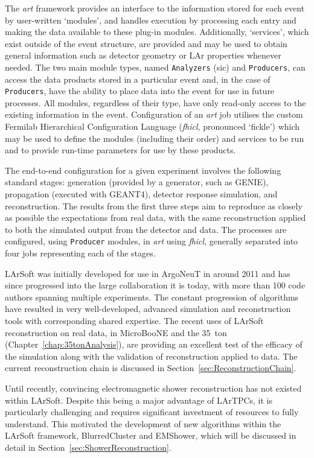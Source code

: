 The \textit{art} framework provides an interface to the information stored for each event by user-written `modules', and handles execution by processing each entry and making the data available to these plug-in modules.  Additionally, `services', which exist outside of the event structure, are provided and may be used to obtain general information such as detector geometry or LAr properties whenever needed.  The two main module types, named \texttt{Analyzers} (sic) and \texttt{Producers}, can access the data products stored in a particular event and, in the case of \texttt{Producers}, have the ability to place data into the event for use in future processes.  All modules, regardless of their type, have only read-only access to the existing information in the event.  Configuration of an \textit{art} job utilises the custom Fermilab Hierarchical Configuration Language (\textit{fhicl}, pronounced `fickle') which may be used to define the modules (including their order) and services to be run and to provide run-time parameters for use by these products.

The end-to-end configuration for a given experiment involves the following standard stages: generation (provided by a generator, such as GENIE), propagation (executed with GEANT4), detector response simulation, and reconstruction.  The results from the first three steps aim to reproduce as closely as possible the expectations from real data, with the same reconstruction applied to both the simulated output from the detector and data.  The processes are configured, using \texttt{Producer} modules, in \textit{art} using \textit{fhicl}, generally separated into four jobs representing each of the stages.

LArSoft was initially developed for use in ArgoNeuT in around 2011 and has since progressed into the large collaboration it is today, with more than 100 code authors spanning multiple experiments.  The constant progression of algorithms have resulted in very well-developed, advanced simulation and reconstruction tools with corresponding shared expertise.  The recent uses of LArSoft reconstruction on real data, in MicroBooNE \cite{MicroBooNEReconstruction2017} and the 35~ton (Chapter~\ref{chap:35tonAnalysis}), are providing an excellent test of the efficacy of the simulation along with the validation of reconstruction applied to data.  The current reconstruction chain is discussed in Section~\ref{sec:ReconstructionChain}.

Until recently, convincing electromagnetic shower reconstruction has not existed within LArSoft.  Despite this being a major advantage of LArTPCs, it is particularly challenging and requires significant investment of resources to fully understand.  This motivated the development of new algorithms within the LArSoft framework, BlurredCluster and EMShower, which will be discussed in detail in Section~\ref{sec:ShowerReconstruction}.

